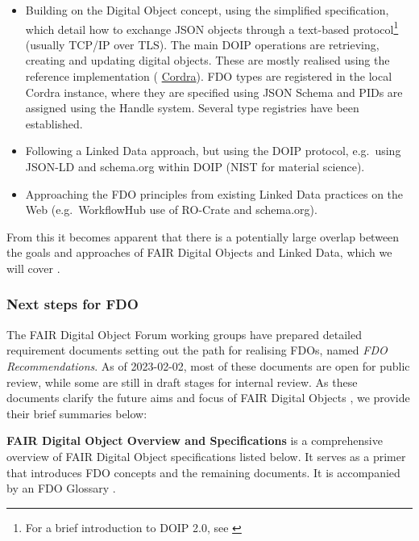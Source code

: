 \documentclass[fleqn,10pt,NOlineno]{wlpeerjlua}
\providecommand{\tightlist}{%
  \setlength{\itemsep}{0pt}\setlength{\parskip}{0pt}}
\begin{document}
\begin{itemize}
\tightlist
\item
  Building on the Digital Object concept, using the simplified \textcite{foundationDigitalObjectInterface} specification, which detail how to exchange JSON objects through a text-based protocol\footnote{For a brief introduction to DOIP 2.0, see \textcite{DOIPExamplesCordraa}} (usually TCP/IP over TLS). The main DOIP operations are retrieving, creating and updating digital objects. These are mostly realised using the reference implementation ( \href{https://cordra.org/}{Cordra}). FDO types are registered in the local Cordra instance, where they are specified using JSON Schema \autocite{Draftbhuttonjsonschema} and PIDs are assigned using the Handle system. Several type registries have been established.
\item
  Following a Linked Data approach, but using the DOIP protocol, e.g.~using JSON-LD and schema.org within DOIP (NIST for material science).
\item
  Approaching the FDO principles from existing Linked Data practices on the Web (e.g.~WorkflowHub use of RO-Crate and schema.org).
\end{itemize}

From this it becomes apparent that there is a potentially large overlap between the goals and approaches of FAIR Digital Objects and Linked Data, which we will cover .


\subsubsection*{Next steps for FDO}\label{sec:next-step-fdo}

The FAIR Digital Object Forum \autocite{FAIRDigitalObjects} working groups have prepared detailed requirement documents \autocite{fdo-Specs} setting out the path for realising FDOs, named \emph{FDO Recommendations}. As of 2023-02-02, most of these documents are open for public review, while some are still in draft stages for internal review. As these documents clarify the future aims and focus of FAIR Digital Objects \autocite{fdo-Roadmap}, we provide their brief summaries below:

\textbf{FAIR Digital Object Overview and Specifications} \autocite{fdo-Overview} is a comprehensive overview of FAIR Digital Object specifications listed below. It serves as a primer that introduces FDO concepts and the remaining documents. It is accompanied by an FDO Glossary \autocite{fdo-Glossary}.
\end{document}
